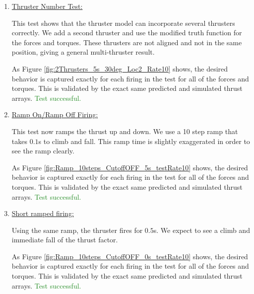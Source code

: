 \begin{enumerate}
	\item{\underline{Thruster Number Test:} }
	
	
	
	This test shows that the thruster model can incorporate several thrusters correctly. We add a second thruster and use the modified truth function for the forces and torques. These thrusters are not aligned and not in the same position, giving a general multi-thruster result.  
	
	
	
	As Figure \ref{fig:2Thrusters_5s_30deg_Loc2_Rate10} shows, the desired behavior is captured exactly for each 
	firing in the test for all of the forces and torques. This is validated by the exact same predicted and simulated thrust arrays.  \textcolor{ForestGreen}{Test successful.}
	
	\item{\underline{Ramp On/Ramp Off Firing:} }
	
	
	
	This test now ramps the thrust up and down. We use a 10 step ramp that takes $0.1$s to climb and fall. This ramp time is slightly exaggerated in order to see the ramp clearly.      
	
	
	As Figure \ref{fig:Ramp_10steps_CutoffOFF_5s_testRate10} shows, the desired behavior is captured exactly for each 
	firing in the test for all of the forces and torques. This is validated by the exact same predicted and simulated thrust arrays. \textcolor{ForestGreen}{Test successful.}
	
	
	\item{\underline{Short ramped firing:} }
	
	
	
	Using the same ramp, the thruster fires for $0.5$s. We expect to see a climb and immediate fall of the thrust factor.
	
	
	
	As Figure \ref{fig:Ramp_10steps_CutoffOFF_0s_testRate10} shows, the desired behavior is captured exactly for each 
	firing in the test for all of the forces and torques. This is validated by the exact same predicted and simulated thrust arrays. \textcolor{ForestGreen}{Test successful.}
	

\end{enumerate}
